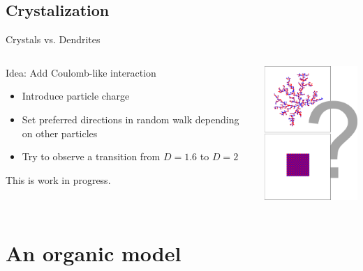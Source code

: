 \documentclass[smaller]{beamer}
\begin{document}
        \subsection{Crystalization}
            \begin{frame}{Crystals vs. Dendrites}
                \begin{center}
                    \begin{columns}
                        \begin{column}{5.5cm}
                            Idea: Add Coulomb-like interaction
                            \begin{itemize}
                                \item Introduce particle charge
                                \item Set preferred directions in random walk depending on other particles
                                \item Try to observe a transition from $D=1.6$ to $D=2$
                            \end{itemize}
        
                            This is work in progress.
                        \end{column}
                        \begin{column}{5cm}
                            \includegraphics[width=4.5cm]{img/coulomb_01.png}
                        \end{column}
                    \end{columns}
                \end{center}
            \end{frame}

    \section{An organic model}
\end{document}

